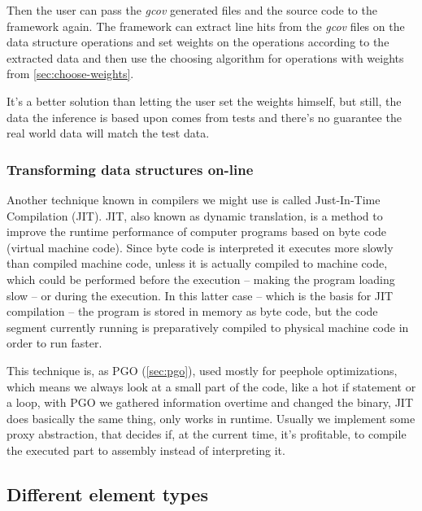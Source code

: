 \documentclass[a4paper,11pt]{article}
\begin{document}
			Then the user can pass the \emph{gcov} generated files and the source code to the framework
			again. The framework can extract line hits from the \emph{gcov} files on the data structure
			operations and set weights on the operations according to the extracted data and then use the
			choosing algorithm for operations with weights from \autoref{sec:choose-weights}.

			It's a better solution than letting the user set the weights himself, but still, the data the
			inference is based upon comes from tests and there's no guarantee the real world data will
			match the test data.

		\subsubsection{Transforming data structures on-line} \label{sec:transforming-on-line}

            Another technique known in compilers we might use is called Just-In-Time Compilation (JIT). JIT, also known
            as dynamic translation, is a method to improve the runtime performance of computer programs based on byte
            code (virtual machine code). Since byte code is interpreted it executes more slowly than compiled machine
            code, unless it is actually compiled to machine code, which could be performed before the execution – making
            the program loading slow – or during the execution. In this latter case – which is the basis for JIT
            compilation – the program is stored in memory as byte code, but the code segment currently running is
            preparatively compiled to physical machine code in order to run faster.\cite{Wijit}

            This technique is, as PGO (\autoref{sec:pgo}), used mostly for peephole optimizations, which means we always
            look at a small part of the code, like a hot if statement or a loop, with PGO we gathered information
            overtime and changed the binary, JIT does basically the same thing, only works in runtime. Usually we
            implement some proxy abstraction, that decides if, at the current time, it's profitable, to compile the
            executed part to assembly instead of interpreting it.

            



	\subsection{Different element types}
\end{document}
